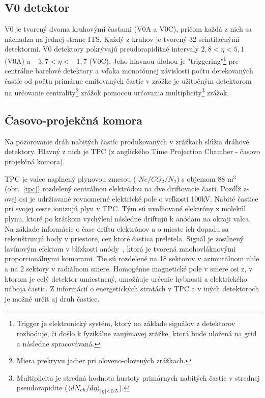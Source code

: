 \documentclass[thesismargins, thesislinespacing]{rnthesis}
\begin{document}
\subsection{V0 detektor}

 V0 je tvorený dvoma kruhovými časťami (V0A a V0C), pričom každá z nich sa náchadza na jednej strane ITS. Každý z kruhov je tvorený 32 scintilačnými detektormi. V0 detektory pokrývajú preudorapiditné intervaly $2,8 <\eta<5,1$ (V0A) a $-3,7<\eta<-1,7$ (V0C). Jeho hlavnou úlohou je "triggering"\footnote{Trigger je elektronický systém, ktorý na základe signálov z detektorov rozhoduje, či došlo k fyzikálne zaujímavej zrážke, ktorá bude uložená na grid a následne spracovávaná.} pre centrálne barelové detektory a vďaka monotónnej závislosti počtu detekovaných častíc od počtu primárne emitovaných častíc v zrážke je užitočným detektorom na určovanie centrality\footnote{Miera prekryvu jadier pri oloveno-olovených zrážkach.} zrážok pomocou určovania multiplicity\footnote{Multiplicita je stredná hodnota hustoty primárnych nabitých častíc v strednej pseudorapidite   \newline  ($\braket{dN_{ch}/d\eta}_{|\eta|<0.5}$).} zrážok.  

\subsection{Časovo-projekčná komora}
\label{textTPC}
Na pozorovanie dráh nabitých častíc produkovaných v zrážkach slúžia dráhové detektory. Hlavný z nich je TPC (z anglického Time Projection Chamber - časovo projekčná komora).

TPC je valec naplnený plynovou zmesou ( $Ne/CO_2/N_2$) s objemom 88 m$^3$ (obr.~\ref{tpc}) rozdelený centrálnou elektródou na dve driftovacie časti. Pozdĺž z-ovej osi je udržiavané rovnomerné elektrické pole o veľkosti 100kV. Nabité častice pri svojej ceste ionizujú plyn v TPC. Tým sú uvoľňované elektróny z molekúl plynu, ktoré po krátkom vychýlení následne driftujú k anódam na okraji valca. Na základe informácie o čase driftu elektrónov a o mieste ich dopadu sa rekonštruujú body v priestore, cez ktoré častica preletela. Signál je zosilnený lavínovým efektom v blízkosti anódy~\cite{TPCobr}, ktorá je tvorená mnohovláknovými proporcionálnymi komorami. Tie sú rozdelené na 18 sektorov v azimutálnom uhle a na 2 sektory v radiálnom smere. Homogénne magnetické pole v smere osi z, v ktorom je celý detektor umiestnený, umožňuje určenie hybnosti a elektrického náboja častíc. Z informácií o energetických stratách v TPC a v iných detektoroch je možné určiť aj druh častice. 
\end{document}
